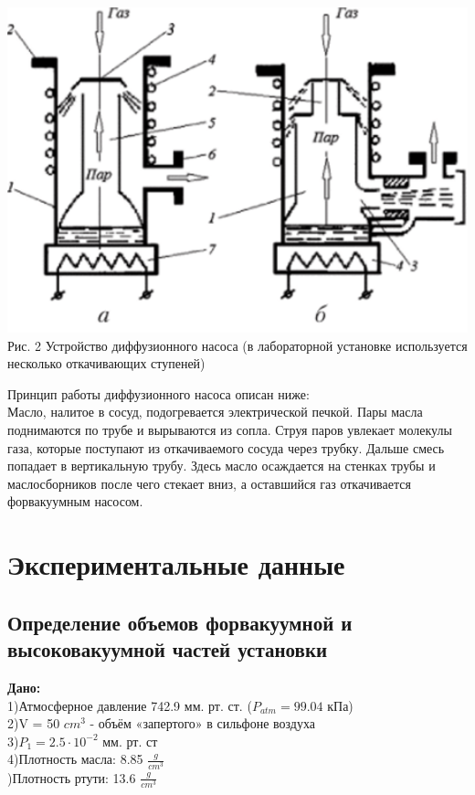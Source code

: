 \documentclass[a4paper, 12pt]{article}
\begin{document}
\begin{center}
	\includegraphics[width=14cm]{2.jpg}
	Рис. 2 Устройство диффузионного насоса (в лабораторной установке используется несколько откачивающих ступеней)
\end{center}
Принцип работы диффузионного насоса описан ниже: \\ 
 Масло, налитое в сосуд, подогревается электрической печкой. Пары масла поднимаются по трубе и вырываются из сопла. Струя паров увлекает молекулы газа, которые поступают из откачиваемого сосуда через трубку. Дальше смесь попадает в вертикальную трубу. Здесь масло осаждается на стенках трубы и маслосборников после чего стекает вниз, а оставшийся газ откачивается форвакуумным насосом.

\section{Экспериментальные данные}
\subsection{Определение объемов форвакуумной и высоковакуумной частей установки}
\textbf{Дано:}\\
1)Атмосферное давление 742.9 мм. рт. ст. ($P_{atm} = 99.04$ кПа)\\
2)V = 50 $cm^3$ - объём «запертого» в сильфоне воздуха\\
3)$P_1 = 2.5 \cdot 10^{-2}$ мм. рт. ст\\
4)Плотность масла: 8.85 $\frac{g}{{cm}^3}$\\
)Плотность ртути: 13.6 $\frac{g}{{cm}^3}$
\end{document}
